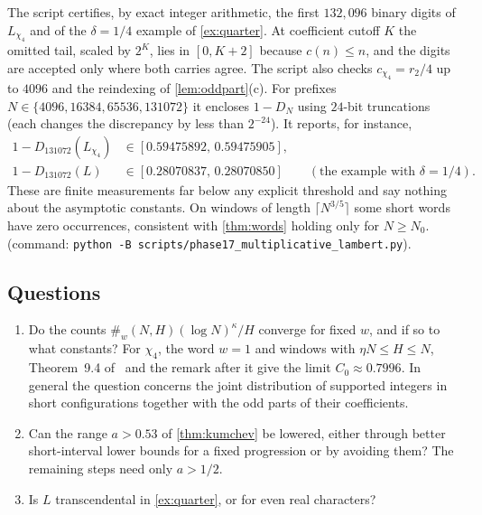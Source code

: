 \documentclass[11pt]{article}
\newcommand{\cnt}{\#}
\begin{document}
The script 
certifies, by exact integer arithmetic, the first $132{,}096$ binary digits of
$L_{\chi_4}$ and of the $\delta=1/4$ example of \cref{ex:quarter}. At
coefficient cutoff $K$ the omitted tail, scaled by $2^K$, lies in $[0,K+2]$
because $c(n)\le n$, and the digits are accepted only where both carries agree.
The script also checks $c_{\chi_4}=r_2/4$ up to $4096$ and the reindexing of
\cref{lem:oddpart}(c). For prefixes $N\in\{4096,16384,65536,131072\}$ it
encloses $1-D_N$ using $24$-bit truncations (each changes the discrepancy by less
than $2^{-24}$). It reports, for instance,
\begin{align*}
1-D_{131072}(L_{\chi_4})&\in[0.59475892,\,0.59475905],\\
1-D_{131072}(L)&\in[0.28070837,\,0.28070850]\qquad(\text{the example with }\delta=1/4).
\end{align*}
These are finite measurements far below any explicit threshold and say nothing
about the asymptotic constants. On windows of length $\lceil N^{3/5}\rceil$ some
short words have zero occurrences, consistent with \cref{thm:words} holding only
for $N\ge N_0$.
 (command: \texttt{python -B scripts/phase17\_multiplicative\_lambert.py}).

\subsection{Questions}

\begin{enumerate}[label=\textup{(Q\arabic*)}]
\item Do the counts $\cnt_w(N,H)(\log N)^{\kappa}/H$ converge for fixed $w$,
  and if so to what constants? For $\chi_4$, the word $w=1$ and windows with
  $\eta N\le H\le N$, Theorem~9.4 of~\cite{BBCP2004} and the remark after it give
  the limit $C_0\approx0.7996$. In general the question concerns the joint
  distribution of supported integers in short configurations together with
  the odd parts of their coefficients.
\item Can the range $a>0.53$ of \cref{thm:kumchev} be lowered, either through
  better short-interval lower bounds for a fixed progression or by avoiding
  them? The remaining steps need only $a>1/2$.
\item Is $L$ transcendental in \cref{ex:quarter}, or for even real characters?
\end{enumerate}
\end{document}
